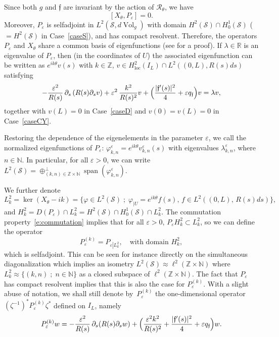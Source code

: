\documentclass[JEP,XML,SOM,Unicode]{cedram}
\newcommand{\sep}{\;;\;}
\theoremstyle{definition}
\newcommand{\calR}{\ensuremath{\mathcal R}}
\newcommand{\calS}{\ensuremath{\mathcal S}}
\newcommand{\mb}[1]{\ensuremath{\mathbb{#1}}}
\newcommand{\N}{{\mb{N}}}
\newcommand{\R}{{\mb{R}}}
\newcommand{\Z}{\mathbb Z}
\newcommand{\f}{\ensuremath{\mathfrak{f}}}
\DeclareMathOperator{\Vol}{Vol}
\DeclareMathOperator{\vect}{span}
\newcommand{\loc}{\mathrm{loc}}
\let\d\partial
\let\eps\varepsilon
\newcommand{\qf}{q_{\f}}
\begin{document}
Since both $g$ and $\f$ are invariant by the action of $\calR_\theta$, we have
\begin{equation}
\label{e:commutation}
[X_{\theta}, P_\eps ] =0.
\end{equation}
Moreover, $P_\eps$ is selfadjoint in $L^2(\calS, d\Vol_g)$ with domain $H^2(\calS) \cap H^1_0(\calS)$ ($=H^2(\calS)$ in Case~\ref{caseS}), and has compact resolvent. Therefore, the operators $P_\eps$ and $X_\theta$ share a common basis of eigenfunctions (see \eg \cite[\S 3.2]{LL:18} for a proof).
If $\lambda \in\R$ is an eigenvalue of $P_\eps$, then (in the coordinates of $U$) the associated eigenfunction can be written as $e^{ik \theta}v(s)$ with $k\in \Z$, $v \in H^2_{\loc}(I_L)\cap L^2\left((0,L), R(s)ds\right)$ satisfying
\begin{equation}
\label{equationk1D}
- \frac{\eps^2 }{R(s)}\, \d_s\left( R(s) \d_s v \right) + \eps^2\,\frac{k^2}{R(s)^2} v+ \Bigl( \frac{|\f'(s)|^2}{4} + \eps \qf\Bigr) v =\lambda v,
\end{equation}
together with $v(L)=0$ in Case~\ref{caseD} and $v(0)=v(L)=0$ in Case~\ref{caseCY}.

Restoring the dependence of the eigenelements in the parameter $\eps$, we call the normalized eigenfunctions of $P_\eps$: $\varphi_{k,n}^\eps=e^{ik \theta} v_{k,n}^\eps(s)$ with eigenvalues $\lambda_{k,n}^\eps$, where \hbox{$n\in \N$}. In particular, for all $\eps>0$, we can write $L^2(\calS)= \oplus^{\perp }_{(k,n)\in \Z\times \N}\vect (\varphi_{k,n}^\eps) $.

We further denote
\[
L^2_k=\ker (X_{\theta}-ik)=\bigl\{\varphi\in L^2(\calS)\sep\varphi_{|U} =e^{ik \theta}f(s),\,f \in L^2\left((0,L),\,R(s)ds\right)\bigr\},
\]
and $H^2_k=D(P_\eps) \cap L^2_k = H^2(\calS)\cap H^1_0(\calS)\cap L^2_k$. The commutation property~\eqref{e:commutation} implies that for all $\eps>0$, $P_\eps H^2_k\subset L^2_k$, so we can define the operator
\begin{equation}
\label{defPk}P_{\eps}^{(k)} =P_{\eps\left|L^2_k\right.}, \quad \text{with domain } H^2_k,
\end{equation}
which is selfadjoint. This can be seen for instance directly on the simultaneous diagonalization which implies an isometry $L^2(\calS) \approx \ell^2(\Z\times \N)$ where $L^2_k\approx\{(k,n)\sep n\in \N\}$ as a closed subspace of $\ell^2(\Z\times \N)$. The fact that $P_{\eps}$ has compact resolvent implies that this is also the case for $P_{\eps}^{(k)}$.
With a slight abuse of notation, we shall still denote by~$P_{\eps}^{(k)}$ the one-dimensional operator $(\zeta^{-1})^*P_{\eps}^{(k)} \zeta^*$ defined on $I_L$, namely
\begin{equation}
\label{equationk1D-bis}
P_{\eps}^{(k)} w = - \frac{\eps^2 }{R(s)}\, \d_s( R(s) \d_s w) + \Bigl(\frac{ \eps^2 k^2}{R(s)^2} + \frac{|\f'(s)|^2}{4} + \eps \qf\Bigr) w.
\end{equation}
\end{document}
